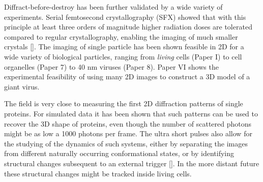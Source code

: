 Diffract-before-destroy has been further validated by a wide variety of experiments. Serial femtosecond crystallography (SFX) showed that with this principle at least three orders of magnitude higher radiation doses are tolerated compared to regular crystallography, enabling the imaging of much smaller crystals []. The imaging of single particle has been shown feasible in 2D for a wide variety of biological particles, ranging from \textit{living} cells (Paper I) to cell organelles (Paper 7) to  40 nm viruses (Paper 8). Paper VI shows the experimental feasibility of using many 2D images to construct a 3D model of a giant virus.

The field is very close to measuring the first 2D diffraction patterns of single proteins. For simulated data it has been shown that such patterns can be used to recover the 3D shape of proteins, even though the number of scattered photons might be as low a 1000 photons per frame. The ultra short pulses also allow for the studying of the dynamics of such systems, either by separating the images from different naturally occurring conformational states, or by identifying structural changes subsequent to an external trigger []. In the more distant future these structural changes might be tracked inside living cells. 
 